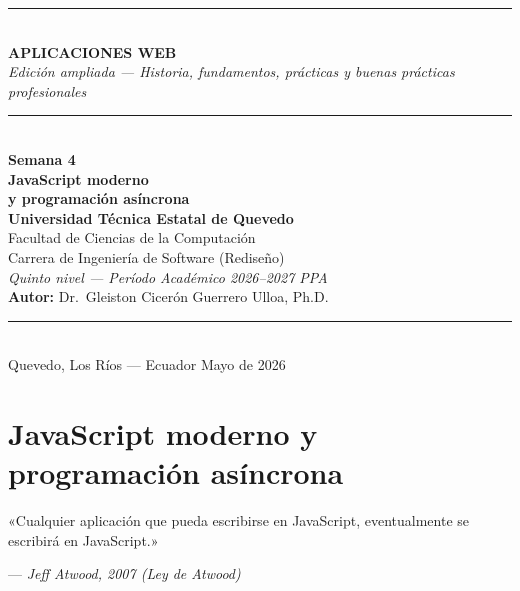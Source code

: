 \documentclass[11pt,a4paper,openany]{book}
\begin{document}
	
	\setlength{\hfuzz}{3pt}
	
	\begin{titlepage}
		\centering\vspace*{1.5cm}
		{\color{uteqverde}\rule{\linewidth}{2pt}}\\[0.8cm]
		{\Huge\bfseries\color{uteqverde} APLICACIONES WEB}\\[0.5cm]
		{\Large\itshape Edición ampliada — Historia, fundamentos, prácticas y
			buenas prácticas profesionales}\\[0.3cm]
		{\color{uteqverde}\rule{\linewidth}{1pt}}\\[1.5cm]
		{\LARGE\bfseries Semana 4}\\[0.5cm]
		{\Huge\bfseries\color{uteqdorado!80!black}
			JavaScript moderno\\[0.3cm]y programación asíncrona}\\[2cm]
		{\large\bfseries Universidad Técnica Estatal de Quevedo}\\
		{\large Facultad de Ciencias de la Computación}\\
		{\large Carrera de Ingeniería de Software (Rediseño)}\\[0.7cm]
		{\large\itshape Quinto nivel — Período Académico 2026--2027 PPA}\\[1.5cm]
		{\large \textbf{Autor:} Dr.\ Gleiston Cicerón Guerrero Ulloa, Ph.D.}\\[2cm]
		{\color{uteqdorado}\rule{\linewidth}{2pt}}\\[0.5cm]
		{\large Quevedo, Los Ríos — Ecuador \hfill Mayo de 2026}
	\end{titlepage}
	
	\tableofcontents
	\newpage
	
	\chapter{JavaScript moderno y programación asíncrona}
	\label{cap:semana4}
	
	\epigraph{«Cualquier aplicación que pueda escribirse en JavaScript,
		eventualmente se escribirá en JavaScript.»}
	{--- \textit{Jeff Atwood, 2007 (Ley de Atwood)}}
	
\end{document}
